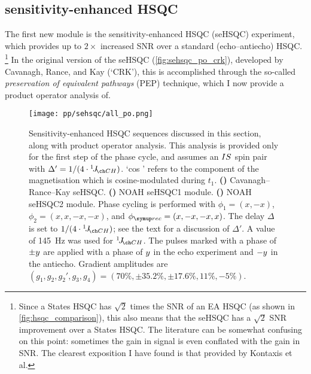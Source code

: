 \subsection{\texorpdfstring{\carbon{}}{13C} sensitivity-enhanced HSQC}
\label{subsec:noah__sehsqc_c}

The first new module is the sensitivity-enhanced HSQC (seHSQC) experiment, which provides up to $2\times$ increased SNR over a standard (echo--antiecho) HSQC.%
\footnote{Since a States HSQC has $\sqrt{2}$ times the SNR of an EA HSQC (as shown in \cref{fig:hsqc_comparison}), this also means that the seHSQC has a $\sqrt{2}$ SNR improvement over a States HSQC. The literature can be somewhat confusing on this point: sometimes the gain in signal is even conflated with the gain in SNR. The clearest exposition I have found is that provided by Kontaxis et al.\autocite{Kontaxis1994JMRSA}}
In the original version of the seHSQC (\cref{fig:sehsqc_po_crk}), developed by Cavanagh, Rance, and Kay (`CRK')\autocite{Palmer1991JMR,Kay1992JACS}, this is accomplished through the so-called \textit{preservation of equivalent pathways} (PEP) technique\autocite{Cavanagh1993ARNMRS}, which I now provide a product operator analysis of.

\begin{figure}[!htbp]
    \centering
    \texttt{[image: pp/sehsqc/all\_po.png]}%
    {\label{fig:sehsqc_po_crk}}%
    {\label{fig:sehsqc_po_noah1}}%
    {\label{fig:sehsqc_po_noah2}}%
    \caption[CRK seHSQC and NOAH seHSQC modules]{
        Sensitivity-enhanced HSQC sequences discussed in this section, along with product operator analysis.
        This analysis is provided only for the first step of the phase cycle, and assumes an $IS\/$ spin pair with $\Delta' = 1 / (4 \cdot \oneJ{CH})$.
        `cos ' refers to the component of the  magnetisation which is cosine-modulated during $t_1$.
        \textbf{()} Cavanagh--Rance--Kay seHSQC.
        \textbf{()} NOAH seHSQC1 module.
        \textbf{()} NOAH seHSQC2 module.
        Phase cycling is performed with $\phi_1 = (x, -x)$, $\phi_2 = (x, x, -x, -x)$, and $\phirec = (x, -x, -x, x)$.
        The delay $\Delta$ is set to $1 / (4 \cdot \oneJ{CH})$; see the text for a discussion of $\Delta'$.
        A value of \qty{145}{\Hz} was used for $\oneJ{CH}$.
        The pulses marked with a phase of $\pm y\/$ are applied with a phase of $y\/$ in the echo experiment and $-y\/$ in the antiecho.
        Gradient amplitudes are $(g_1, g_2, g_2', g_3, g_4) = (70\%, \pm 35.2\%, \pm 17.6\%, 11\%, -5\%)$.
    }
    \label{fig:sehsqc_po}
\end{figure}


